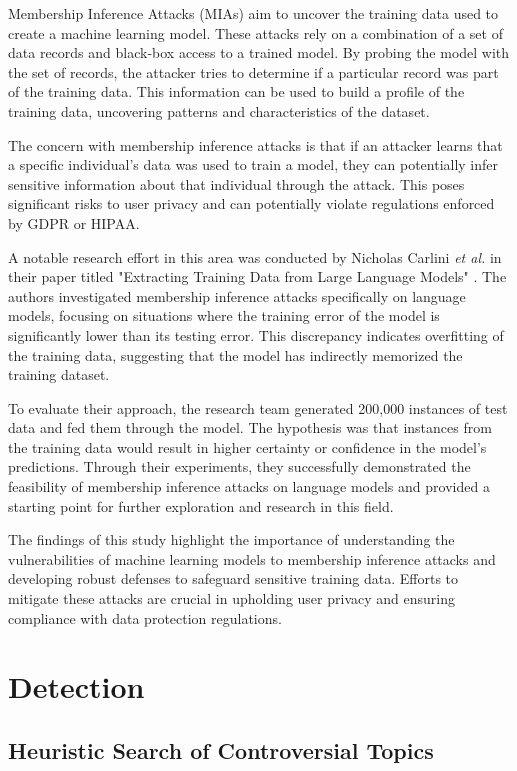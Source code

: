 Membership Inference Attacks (MIAs) aim to uncover the training data used to create a machine learning model. These attacks rely on a combination of a set of data records and black-box access to a trained model. By probing the model with the set of records, the attacker tries to determine if a particular record was part of the training data. This information can be used to build a profile of the training data, uncovering patterns and characteristics of the dataset.

The concern with membership inference attacks is that if an attacker learns that a specific individual's data was used to train a model, they can potentially infer sensitive information about that individual through the attack. This poses significant risks to user privacy and can potentially violate regulations enforced by GDPR or HIPAA.

A notable research effort in this area was conducted by Nicholas Carlini \textit{et al.} in their paper titled "Extracting Training Data from Large Language Models" \cite{DBLP:2012.07805}. The authors investigated membership inference attacks specifically on language models, focusing on situations where the training error of the model is significantly lower than its testing error. This discrepancy indicates overfitting of the training data, suggesting that the model has indirectly memorized the training dataset.

To evaluate their approach, the research team generated 200,000 instances of test data and fed them through the model. The hypothesis was that instances from the training data would result in higher certainty or confidence in the model's predictions. Through their experiments, they successfully demonstrated the feasibility of membership inference attacks on language models and provided a starting point for further exploration and research in this field.

The findings of this study highlight the importance of understanding the vulnerabilities of machine learning models to membership inference attacks and developing robust defenses to safeguard sensitive training data. Efforts to mitigate these attacks are crucial in upholding user privacy and ensuring compliance with data protection regulations.

\section{Detection}

\subsection{Heuristic Search of Controversial Topics}

